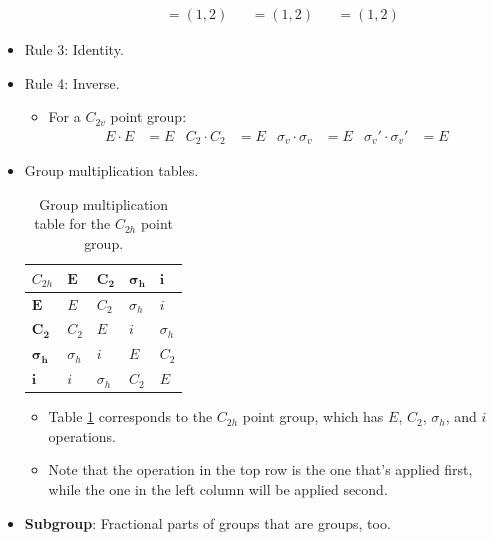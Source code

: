 \documentclass[../notes.tex]{subfiles}
\begin{document}
\begin{itemize}
\begin{itemize}
\begin{align*}
            &= (1,2)&
                &= (1,2)&
                    &= (1,2)
        \end{align*}
    \end{itemize}
    \item Rule 3: Identity.
    \item Rule 4: Inverse.
    \begin{itemize}
        \item For a $C_{2v}$ point group:
        \begin{align*}
            E\cdot E &= E&
            C_2\cdot C_2 &= E&
            \sigma_v\cdot\sigma_v &= E&
            \sigma_v'\cdot\sigma_v' &= E
        \end{align*}
    \end{itemize}
    \item Group multiplication tables.
    \begin{table}[H]
        \centering
        \renewcommand{\arraystretch}{1.4}
        \footnotesize
        \begin{tabular}{l|llll}
            \normalsize$C_{2h}$ & $\bm{E}$   & $\bm{C_2}$ & $\bm{\sigma_h}$ & $\bm{i}$\\
            \hline
            $\bm{E}$            & $E$        & $C_2$      & $\sigma_h$      & $i$\\
            $\bm{C_2}$          & $C_2$      & $E$        & $i$             & $\sigma_h$\\
            $\bm{\sigma_h}$     & $\sigma_h$ & $i$        & $E$             & $C_2$\\
            $\bm{i}$            & $i$        & $\sigma_h$ & $C_2$           & $E$\\
        \end{tabular}
        \caption{Group multiplication table for the $C_{2h}$ point group.}
        \label{tab:groupMultiplication-C2h}
    \end{table}
    \begin{itemize}
        \item Table \ref{tab:groupMultiplication-C2h} corresponds to the $C_{2h}$ point group, which has $E$, $C_2$, $\sigma_h$, and $i$ operations.
        \item Note that the operation in the top row is the one that's applied first, while the one in the left column will be applied second.
    \end{itemize}
    \item \textbf{Subgroup}: Fractional parts of groups that are groups, too.
    \begin{table}[h!]

\end{table}
\end{itemize}
\end{document}
